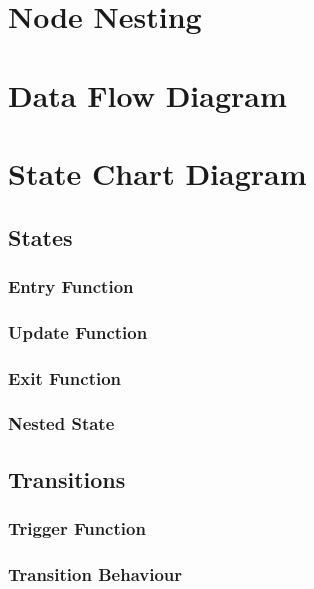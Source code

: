 \chapter{Node Nesting}
\label{nodenesting}

\chapter{Data Flow Diagram}
\label{dataflowdiagram}

\chapter{State Chart Diagram}
\label{statechartdiagram}

\section{States}
\label{states}

\subsection{Entry Function}
\label{entryfunction}

\subsection{Update Function}
\label{updatefunction}

\subsection{Exit Function}
\label{exitfunction}

\subsection{Nested State}
\label{nestedstate}

\section{Transitions}
\label{transitions}

\subsection{Trigger Function}
\label{triggerfunction}

\subsection{Transition Behaviour}
\label{transitionbehaviour}

